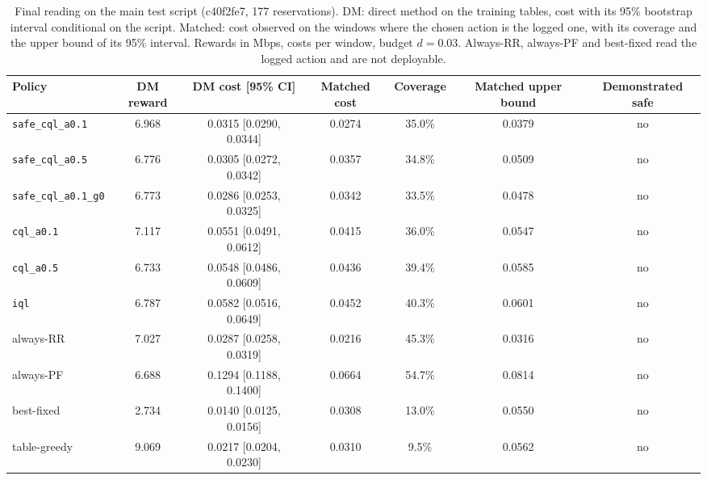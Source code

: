 \begin{table}[t]
\centering
\caption{Final reading on the main test script (c40f2fe7, 177 reservations). DM: direct method on the training tables, cost with its 95\% bootstrap interval conditional on the script. Matched: cost observed on the windows where the chosen action is the logged one, with its coverage and the upper bound of its 95\% interval. Rewards in Mbps, costs per window, budget $d=0.03$. Always-RR, always-PF and best-fixed read the logged action and are not deployable.}%
\label{tab:e12_main}
\footnotesize
\begin{tabular}{lcccccc}
\hline
Policy & DM reward & DM cost [95\% CI] & Matched cost & Coverage & Matched upper bound & Demonstrated safe \\
\hline
\texttt{safe\_cql\_a0.1} & 6.968 & 0.0315 [0.0290, 0.0344] & 0.0274 & 35.0\% & 0.0379 & no \\
\texttt{safe\_cql\_a0.5} & 6.776 & 0.0305 [0.0272, 0.0342] & 0.0357 & 34.8\% & 0.0509 & no \\
\texttt{safe\_cql\_a0.1\_g0} & 6.773 & 0.0286 [0.0253, 0.0325] & 0.0342 & 33.5\% & 0.0478 & no \\
\texttt{cql\_a0.1} & 7.117 & 0.0551 [0.0491, 0.0612] & 0.0415 & 36.0\% & 0.0547 & no \\
\texttt{cql\_a0.5} & 6.733 & 0.0548 [0.0486, 0.0609] & 0.0436 & 39.4\% & 0.0585 & no \\
\texttt{iql} & 6.787 & 0.0582 [0.0516, 0.0649] & 0.0452 & 40.3\% & 0.0601 & no \\
always-RR & 7.027 & 0.0287 [0.0258, 0.0319] & 0.0216 & 45.3\% & 0.0316 & no \\
always-PF & 6.688 & 0.1294 [0.1188, 0.1400] & 0.0664 & 54.7\% & 0.0814 & no \\
best-fixed & 2.734 & 0.0140 [0.0125, 0.0156] & 0.0308 & 13.0\% & 0.0550 & no \\
table-greedy & 9.069 & 0.0217 [0.0204, 0.0230] & 0.0310 & 9.5\% & 0.0562 & no \\
\hline
\end{tabular}
\end{table}

